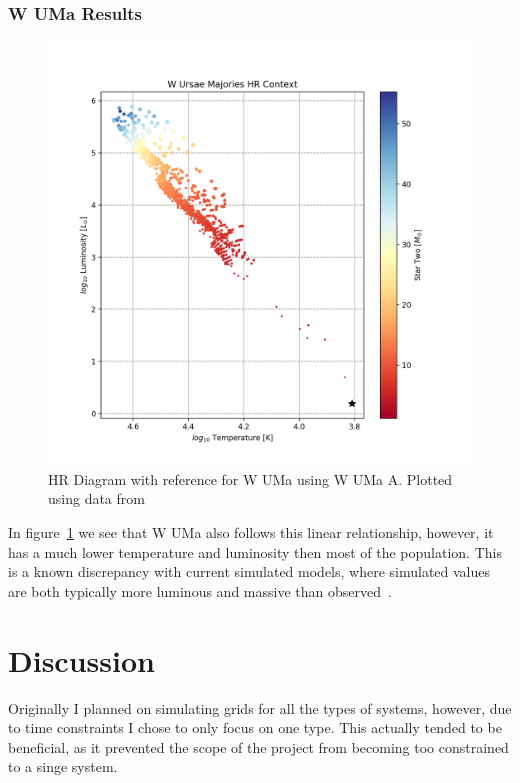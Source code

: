 \documentclass[12pt, a4paper]{article}
\begin{document}
        \subsubsection{W UMa Results} \label{WUMaResults}
            \begin{figure}[H]
                \centering
                \includegraphics[scale = .6]{figs/GeneratedFigs/W_UMa/WUMaHRDiagram.png}
                \caption{HR Diagram with reference for W UMa using W UMa A. Plotted using data from}
                \label{fig:WUMaHRDiagramPOSYDONComp}
            \end{figure}

            In figure~\ref{fig:WUMaHRDiagramPOSYDONComp} we see that W UMa also follows this linear relationship, however, it has a much lower temperature and luminosity then most of the population. This is a known discrepancy with current simulated models, where simulated values are both typically more luminous and massive than observed~\parencite{Fabry_2025}.

\section{Discussion}   
    Originally I planned on simulating grids for all the types of systems, however, due to time constraints I chose to only focus on one type. This actually tended to be beneficial, as it prevented the scope of the project from becoming too constrained to a singe system. 
\end{document}
